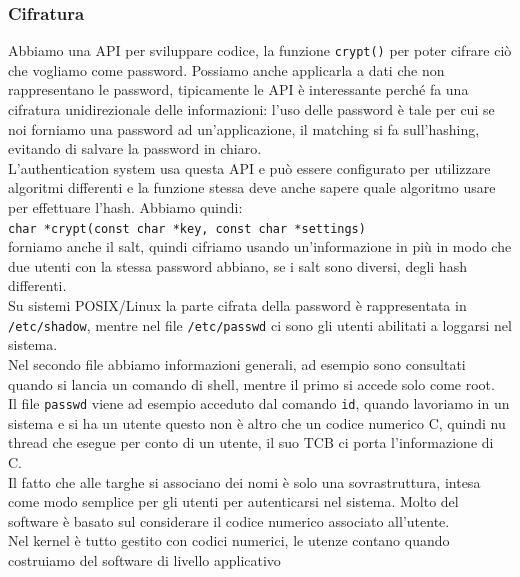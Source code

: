 \documentclass[12pt, oneside]{extbook}
\begin{document}
\subsubsection{Cifratura}
Abbiamo una API per sviluppare codice, la funzione \texttt{crypt()} per poter cifrare ciò che vogliamo come password. Possiamo anche applicarla a dati che non rappresentano le password, tipicamente le API è interessante perché fa una cifratura unidirezionale delle informazioni: l'uso delle password è tale per cui se noi forniamo una password ad un'applicazione, il matching si fa sull'hashing, evitando di salvare la password in chiaro.\\L'authentication system usa questa API e può essere configurato per utilizzare algoritmi differenti e la funzione stessa deve anche sapere quale algoritmo usare per effettuare l'hash. Abbiamo quindi:\\
\texttt{char *crypt(const char *key, const char *settings)}\\forniamo anche il salt, quindi cifriamo usando un'informazione in più in modo che due utenti con la stessa password abbiano, se i salt sono diversi, degli hash differenti.\\Su sistemi POSIX/Linux la parte cifrata della password è rappresentata in \texttt{/etc/shadow}, mentre nel file \texttt{/etc/passwd} ci sono gli utenti abilitati a loggarsi nel sistema.\\Nel secondo file abbiamo informazioni generali, ad  esempio sono consultati quando si lancia un comando di shell, mentre il primo si accede solo come root.\\Il file \texttt{passwd} viene ad esempio acceduto dal comando \texttt{id}, quando lavoriamo in un sistema e si ha un utente questo non è altro che un codice numerico C, quindi nu thread che esegue per conto di un utente, il suo TCB ci porta l'informazione di C.\\Il fatto che alle targhe si associano dei nomi è solo una sovrastruttura, intesa come modo semplice per gli utenti per autenticarsi nel sistema. Molto del software è basato sul considerare il codice numerico associato all'utente.\\Nel kernel è tutto gestito con codici numerici, le utenze contano quando costruiamo del software di livello applicativo
\end{document}
